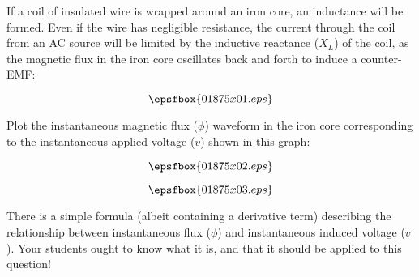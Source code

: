 

If a coil of insulated wire is wrapped around an iron core, an inductance will be formed.  Even if the wire has negligible resistance, the current through the coil from an AC source will be limited by the inductive reactance ($X_L$) of the coil, as the magnetic flux in the iron core oscillates back and forth to induce a counter-EMF:

$$\epsfbox{01875x01.eps}$$

Plot the instantaneous magnetic flux ($\phi$) waveform in the iron core corresponding to the instantaneous applied voltage ($v$) shown in this graph:

$$\epsfbox{01875x02.eps}$$







$$\epsfbox{01875x03.eps}$$







There is a simple formula (albeit containing a derivative term) describing the relationship between instantaneous flux ($\phi$) and instantaneous induced voltage ($v$).  Your students ought to know what it is, and that it should be applied to this question!




